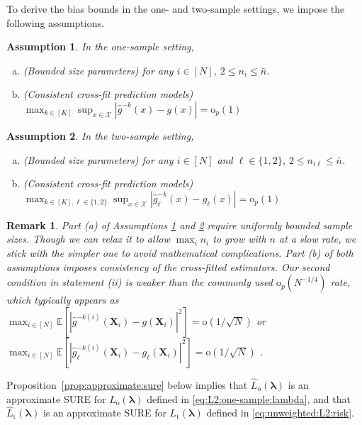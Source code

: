 \documentclass[12pt,letterpaper]{article}
\newtheorem{assumption}{Assumption}[section]
\newtheorem{remark}{Remark}[section]
\begin{document}
To derive the bias bounds in the one- and two-sample settings, we impose the following assumptions. 

\begin{assumption}\label{assump:one_sample}
In the one-sample setting,
\begin{enumerate}[(a)]
\item (Bounded size parameters) for any $i\in [N]$, $2 \le n_i \le \bar n$.
\item (Consistent cross-fit prediction models) $\displaystyle\max_{k\in[K]}\sup_{x\in\mathcal{X}}|\hat{g}^{-k}(x)-g(x)|=\mathrm{o}_p(1)$
\end{enumerate}
\end{assumption}

\begin{assumption}\label{assump:two_sample}
In the two-sample setting,
\begin{enumerate}[(a)]
\item (Bounded size parameters) for any $i\in [N]$ and $\ell\in \{1,2\}$, $2 \le n_{i\ell} \le \bar n$.
\item (Consistent cross-fit prediction models) $\displaystyle\max_{k\in[K], \ell\in \{1,2\}}\sup_{x\in\mathcal{X}}|\hat{g}_\ell^{-k}(x)-g_\ell(x)|=\mathrm{o}_p(1)$
\end{enumerate}
\end{assumption}

\begin{remark}
Part (a) of Assumptions \ref{assump:one_sample} and \ref{assump:two_sample} require uniformly bounded sample sizes. Though we can relax it to allow $\max_i n_i$ to grow with $n$ at a slow rate, we stick with the simpler one to avoid mathematical complications. Part (b) of both assumptions imposes consistency of the cross-fitted estimators. Our second condition in statement (ii) is weaker than the commonly used $\mathrm{o}_p\left(N^{-1/4}\right)$ rate, which typically appears as $\displaystyle\max_{i\in[N]}\mathbb{E}\left[|\hat{g}^{-k(i)}(\mathbf{X}_i)-g(\mathbf{X}_i)|^2\right]=\mathrm{o}(1/\sqrt{N})$ or $\displaystyle\max_{i\in[N]}\mathbb{E}\left[|\hat{g}_{\ell}^{-k(i)}(\mathbf{X}_i)-g_{\ell}(\mathbf{X}_i)|^2\right]=\mathrm{o}(1/\sqrt{N})$
\citep[e.g.][]{chernozhukov2018double,newey2018cross}. 
\end{remark}

Proposition~\ref{prop:approximate:sure} below implies that $\hat{L}_{\mathrm{o}}(\boldsymbol{\lambda})$ is an approximate SURE for $L_{\mathrm{o}}(\boldsymbol{\lambda})$ defined in \eqref{eq:L2:one-sample:lambda}, and that $\hat{L}_{\mathrm{t}}(\boldsymbol{\lambda})$ is an approximate SURE for $L_{\mathrm{t}}(\boldsymbol{\lambda})$ defined in \eqref{eq:unweighted:L2:risk}. 
\end{document}
